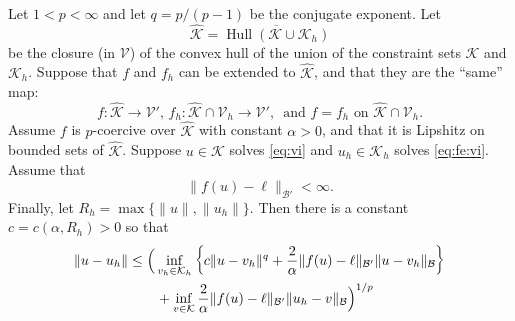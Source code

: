 \documentclass[hidelinks,onefignum,onetabnum,final]{siamart220329}  %
\newcommand{\cB}{\mathcal{B}}
\newcommand{\cK}{\mathcal{K}}
\newcommand{\cV}{\mathcal{V}}
\newcommand{\hcK}{\widehat{\cK}}
\DeclareMathOperator*{\Hull}{Hull}
\begin{document}
\begin{theorem} \label{thm:abstractestimate}
Let $1<p<\infty$ and let $q=p/(p-1)$ be the conjugate exponent.  Let
\begin{equation}
\hcK = \overline{\Hull{(\cK \cup \cK_h)}}  \label{eq:convexhull}
\end{equation}
be the closure (in $\cV$) of the convex hull of the union of the constraint sets $\cK$ and $\cK_h$.  Suppose that $f$ and $f_h$ can be extended to $\hcK$, and that they are the ``same'' map:
\begin{equation}
f:\hcK \to \cV', \, f_h:\hcK \cap \cV_h \to \cV', \, \text{ and } f=f_h \text{ on } \hcK \cap \cV_h.  \label{eq:commonextension}
\end{equation}
Assume $f$ is $p$-coercive over $\hcK$ with constant $\alpha>0$, and that it is Lipshitz on bounded sets of $\hcK$.  Suppose $u\in\cK$ solves \eqref{eq:vi} and $u_h\in\cK_h$ solves \eqref{eq:fe:vi}.  Assume that
\begin{equation}
\|f(u)-\ell\|_{\cB'} < \infty.  \label{eq:fellboundedB}
\end{equation}
Finally, let $R_h=\max\{\|u\|,\|u_h\|\}$.  Then there is a constant $c=c(\alpha,R_h)>0$ so that
\begin{align}
\|u-u_h\| &\le \Big(\inf_{v_h\in\cK_h} \left\{c \|u - v_h\|^q + \frac{2}{\alpha} \|f(u)-\ell\|_{\cB'} \|u-v_h\|_{\cB}\right\} \label{eq:abstractestimate} \\
   &\qquad + \inf_{v\in\cK} \frac{2}{\alpha} \|f(u)-\ell\|_{\cB'} \|u_h-v\|_{\cB}\Big)^{1/p} \notag
\end{align}
\end{theorem}
\end{document}
